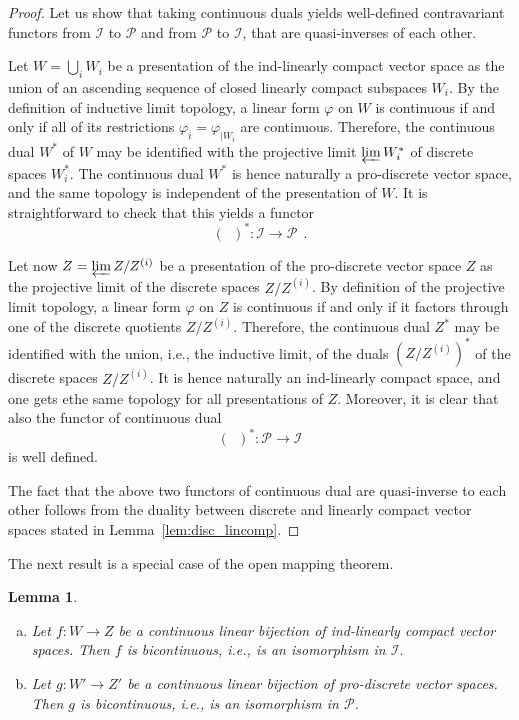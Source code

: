 \documentclass[12pt,reqno]{amsart}
\newtheorem{lem}[thm]{Lemma}
\theoremstyle{definition}
\theoremstyle{remark}
\begin{document}
	\begin{proof}
	    Let us show that taking continuous duals yields well-defined contravariant functors from $\mathcal{I}$ to $\mathcal{P}$ and from $\mathcal{P}$ to $\mathcal{I}$, that are quasi-inverses of each other.
	    
	    Let $W = \bigcup_i W_i$ be a presentation of the ind-linearly compact vector space as the union of an ascending sequence of closed linearly compact subspaces $W_i$. By the definition of inductive limit topology, a linear form $\varphi$ on $W$ is continuous if and only if all of its restrictions $\varphi_i = \varphi_{|W_i}$ are continuous. Therefore, the continuous dual $W^\ast$ of $W$ may be identified with the projective limit $\varprojlim W_i ^\ast$ of discrete spaces $W_i^\ast$. The continuous dual $W^\ast$ is hence naturally a pro-discrete vector space, and the same topology is independent of the presentation of $W$. It is straightforward to check that this yields a functor 
	    $$
	    (\phantom{a})^\ast : \mathcal{I} \rightarrow \mathcal{P}\ \ .
	    $$
	    
	    Let now $Z = \varprojlim Z/Z^{(i)}$ be a presentation of the pro-discrete vector space $Z$ as the projective limit of the discrete spaces $Z/Z^{(i)}$. By definition of the projective limit topology, a linear form $\varphi$ on $Z$ is continuous if and only if it factors through one of the discrete quotients $Z/Z^{(i)}$. Therefore, the continuous dual $Z^\ast$ may be identified with the union, i.e., the inductive limit, of the duals $(Z/Z^{(i)})^\ast$ of the discrete spaces $Z/Z^{(i)}$. It is hence naturally an ind-linearly compact space, and one gets ethe same topology for all presentations of $Z$. Moreover, it is clear that also the functor of continuous dual
	    $$
	    (\phantom{a})^\ast : \mathcal{P} \rightarrow \mathcal{I}
	    $$
	    is well defined.
	    
	    The fact that the above two functors of continuous dual are quasi-inverse to each other follows from the duality between discrete and linearly compact vector spaces stated in Lemma~\ref{lem:disc_lincomp}.
	    
	\end{proof}
	
	The next result is a special case of the open mapping theorem.
\begin{lem}\label{lem:iso-ind}
        \begin{enumerate}[(a)]
            \item Let $f:W\rightarrow Z$ be a continuous linear bijection of ind-linearly compact vector spaces. Then $f$ is bicontinuous, i.e., is an isomorphism in $\mathcal{I}$.
            \item Let $g:W'\rightarrow Z'$ be a continuous linear bijection of pro-discrete vector spaces. Then $g$ is bicontinuous, i.e., is an isomorphism in $\mathcal{P}$.
        \end{enumerate}
		 
	\end{lem}
	
\end{document}
